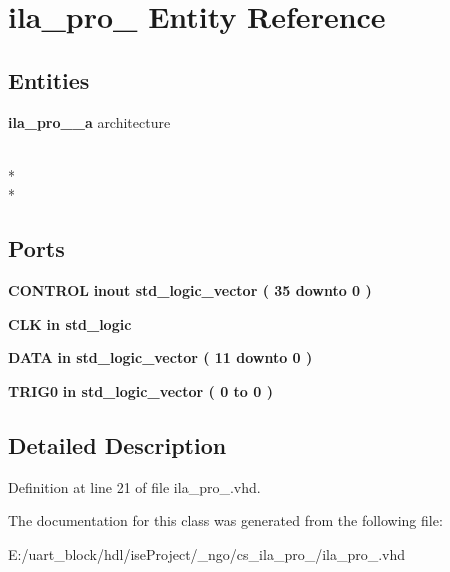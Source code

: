 \section{ila\-\_\-pro\-\_ Entity Reference}
\label{classila__pro__0}
\subsection*{Entities}
\begin{DoxyCompactItemize}
\item 
{\bf ila\-\_\-pro\-\_\-\_\-a} architecture
\end{DoxyCompactItemize}
\\*
\\*
\subsection*{Ports}
 \begin{DoxyCompactItemize}
\item 
{\bf C\-O\-N\-T\-R\-O\-L}  {\bfseries {\bfseries inout }} {\bfseries std\-\_\-logic\-\_\-vector (   35    downto    0  ) } \label{classila__pro__0_aaea3482d31dd85368d876c2e46f45b4c}

\item 
{\bf C\-L\-K}  {\bfseries {\bfseries in }} {\bfseries std\-\_\-logic } \label{classila__pro__0_a82e66d1b6102bc96646a79a31bc88652}

\item 
{\bf D\-A\-T\-A}  {\bfseries {\bfseries in }} {\bfseries std\-\_\-logic\-\_\-vector (   11    downto    0  ) } \label{classila__pro__0_a2d5f13abd991e818478842de6f09d08c}

\item 
{\bf T\-R\-I\-G0}  {\bfseries {\bfseries in }} {\bfseries std\-\_\-logic\-\_\-vector (   0    to    0  ) } \label{classila__pro__0_a634110671bf584451108c157d7c74b17}

\end{DoxyCompactItemize}


\subsection{Detailed Description}


Definition at line 21 of file ila\-\_\-pro\-\_.\-vhd.



The documentation for this class was generated from the following file\-:\begin{DoxyCompactItemize}
\item 
E\-:/uart\-\_\-block/hdl/ise\-Project/\-\_\-ngo/cs\-\_\-ila\-\_\-pro\-\_/ila\-\_\-pro\-\_.\-vhd\end{DoxyCompactItemize}
